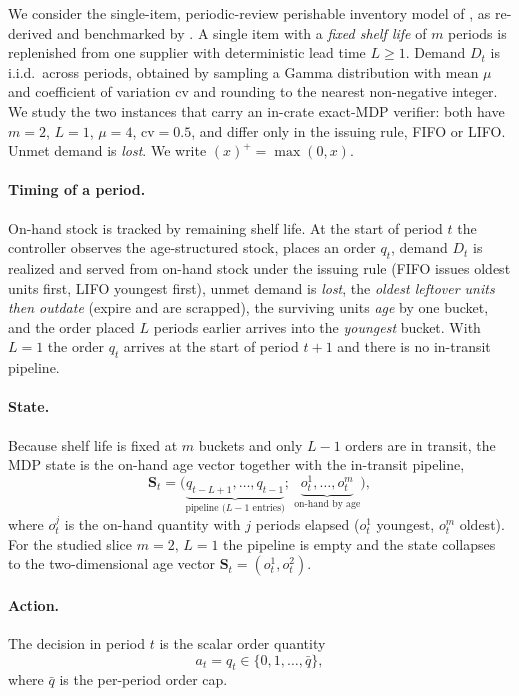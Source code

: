 We consider the single-item, periodic-review perishable inventory model of
\citet{deMoor2022perishable}, as re-derived and benchmarked by \citet{farrington2025perishable}.
A single item with a \emph{fixed shelf life} of $m$ periods is replenished from one supplier with
deterministic lead time $L\ge 1$. Demand $D_t$ is i.i.d.\ across periods, obtained by sampling a
Gamma distribution with mean $\mu$ and coefficient of variation $\mathrm{cv}$ and rounding to the
nearest non-negative integer. We study the two instances that carry an in-crate exact-MDP verifier:
both have $m=2$, $L=1$, $\mu=4$, $\mathrm{cv}=0.5$, and differ only in the issuing rule, FIFO or LIFO.
Unmet demand is \emph{lost}. We write $(x)^+=\max(0,x)$.

\paragraph{Timing of a period.}
On-hand stock is tracked by remaining shelf life. At the start of period $t$ the controller observes
the age-structured stock, places an order $q_t$, demand $D_t$ is realized and served from on-hand
stock under the issuing rule (FIFO issues oldest units first, LIFO youngest first), unmet demand is
\emph{lost}, the \emph{oldest leftover units then outdate} (expire and are scrapped), the surviving
units \emph{age} by one bucket, and the order placed $L$ periods earlier arrives into the
\emph{youngest} bucket. With $L=1$ the order $q_t$ arrives at the start of period $t+1$ and there is
no in-transit pipeline.

\paragraph{State.}
Because shelf life is fixed at $m$ buckets and only $L-1$ orders are in transit, the MDP state is the
on-hand age vector together with the in-transit pipeline,
\begin{equation*}
    \mathbf{S}_t=\bigl(\underbrace{q_{t-L+1},\dots,q_{t-1}}_{\text{pipeline (}L-1\text{ entries)}};\ \underbrace{o^{1}_t,\dots,o^{m}_t}_{\text{on-hand by age}}\bigr),
\end{equation*}
where $o^{j}_t$ is the on-hand quantity with $j$ periods elapsed ($o^{1}_t$ youngest, $o^{m}_t$
oldest). For the studied slice $m=2,\,L=1$ the pipeline is empty and the state collapses to the
two-dimensional age vector $\mathbf{S}_t=(o^{1}_t,o^{2}_t)$.

\paragraph{Action.}
The decision in period $t$ is the scalar order quantity
\begin{equation*}
    a_t=q_t\in\{0,1,\dots,\bar q\},
\end{equation*}
where $\bar q$ is the per-period order cap.

